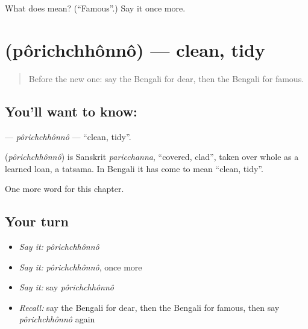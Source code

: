 \begin{tcolorbox}[breakable,colback=teal!4,colframe=teal!35!black,title={Before you move on}]
What does  mean? (\textquotedblleft{}Famous\textquotedblright{}.) Say it once more.
\end{tcolorbox}
\section[\texorpdfstring{\bn{পরিচ্ছন্ন} (pôrichchhônnô)}{পরিচ্ছন্ন (pôrichchhônnô)}]{ (pôrichchhônnô) — clean, tidy}

\label{lesson:BN-C142-porichchhonno}



\begin{quote}
Before the new one: say the Bengali for dear, then the Bengali for famous.
\end{quote}

\subsection*{You'll want to know: }
\textbf{} — \emph{pôrichchhônnô} — \textquotedblleft{}clean, tidy\textquotedblright{}.

\begin{cousinweb}
\textbf{} (\emph{pôrichchhônnô}) is Sanskrit \emph{paricchanna}, \textquotedblleft{}covered, clad\textquotedblright{}, taken over whole as a learned loan, a tatsama. In Bengali it has come to mean \textquotedblleft{}clean, tidy\textquotedblright{}.
\end{cousinweb}

\begin{grammarlens}[title={What you've built}]
One more word for this chapter.
\end{grammarlens}

\subsection*{Your turn}
\begin{itemize}
\raggedright
  \item \emph{Say it:} \emph{pôrichchhônnô}
  \item \emph{Say it:} \emph{pôrichchhônnô}, once more
  \item \emph{Say it:} say \emph{pôrichchhônnô}
  \item \emph{Recall:} say the Bengali for dear, then the Bengali for famous, then say \emph{pôrichchhônnô} again
\end{itemize}

